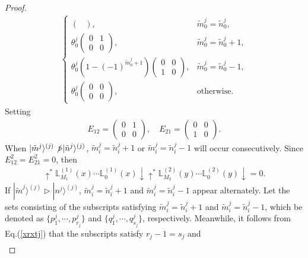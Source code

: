 \documentclass[10pt,a4paper]{amsart}
\begin{document}
\begin{proof}
\begin{align}
\begin{cases}
\begin{pmatrix}
				\end{pmatrix}, & \tilde{m}_0^{j} = \tilde{n}_0^{j}, \\
				\theta_0^{j}
				\begin{pmatrix}
					0 & 1 \\
					0 & 0
				\end{pmatrix}, & \tilde{m}^{j}_0 = \tilde{n}_0^{j} + 1, \\
				\theta_0^{j}(1 - (-1)^{\tilde{m}_0^{j}+1})
				\begin{pmatrix}
					0 & 0 \\
					1 & 0
				\end{pmatrix}, & \tilde{m}_0^{j} = \tilde{n}_0^{j} - 1, \\
				\theta_0^{j}
				\begin{pmatrix}
					0 & 0 \\
					0 & 0
				\end{pmatrix}, & \text{otherwise}.
			\end{cases}
		\end{align}
		Setting
		\begin{align}
			E_{12}=\begin{pmatrix}
				0 & 1 \\
				0 & 0
			\end{pmatrix}, \quad
			E_{21}=\begin{pmatrix}
				0 & 0 \\
				1 & 0
			\end{pmatrix}.
		\end{align}
		When $|\tilde{m}^{j}\rangle^{(j)} \not\triangleright |\tilde{n}^j \rangle^{(j)} $, $\tilde{m}^{j}_i = \tilde{n}_i^{j} + 1$ or $\tilde{m}_i^{j} = \tilde{n}_i^{j}-1$ will occur consecutively.
		Since $E_{12}^2=E_{21}^2=0$, then
		\begin{align}
			\uparrow^*
			\mathbb{L}_{M_1}^{(1)}(x)\cdots \mathbb{L}_0^{(1)}(x)\downarrow \uparrow^* \mathbb{L}_{M_2}^{(2)}(y)\cdots \mathbb{L}_0^{(2)}(y)
			\downarrow=0.
		\end{align}
		If $|\tilde{m}^{j}\rangle^{(j)} \triangleright |n^j \rangle^{(j)}$, $\tilde{m}^{j}_i = \tilde{n}_i^{j} + 1$ and $\tilde{m}_i^{j} = \tilde{n}_i^{j}-1$ appear alternately.
		Let the sets consisting of the subscripts satisfying $\tilde{m}^{j}_i = \tilde{n}_i^{j} + 1$ and $\tilde{m}_i^{j} = \tilde{n}_i^{j}-1$, which be denoted as  $\{p_1^{j},\cdots,p_{r_j}^{j} \}$ and $\{q_1^{j},\cdots,q_{s_j}^{j} \}$, respectively.
		Meanwhile, it follows from Eq.(\ref{xrxtj}) that the subscripts satisfy  $r_j -1 = s_j$ and
		\begin{align}

\end{align}
\end{proof}
\end{document}
